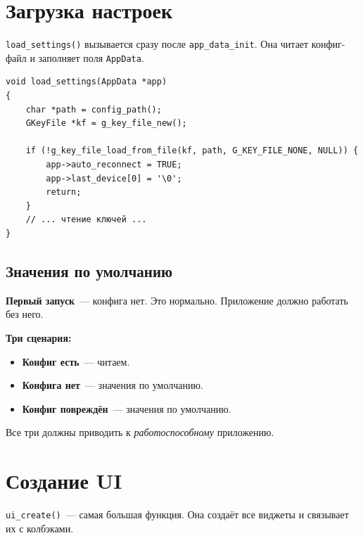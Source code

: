 \section{Загрузка настроек}
\label{sec:lifecycle-load}

\texttt{load\_settings()} вызывается сразу после
\texttt{app\_data\_init}. Она читает конфиг-файл
и заполняет поля \texttt{AppData}.

\begin{listing}[htbp]
\begin{verbatim}
void load_settings(AppData *app)
{
    char *path = config_path();
    GKeyFile *kf = g_key_file_new();

    if (!g_key_file_load_from_file(kf, path, G_KEY_FILE_NONE, NULL)) {
        app->auto_reconnect = TRUE;
        app->last_device[0] = '\0';
        return;
    }
    // ... чтение ключей ...
}
\end{verbatim}
\caption{\texttt{load\_settings()}~--- загрузка}
\label{lst:lifecycle-load}
\end{listing}

\subsection{Значения по умолчанию}

\textbf{Первый запуск}~--- конфига нет. Это нормально.
Приложение должно работать без него.

\begin{keybox}
\textbf{Три сценария:}
\begin{itemize}
    \item \textbf{Конфиг есть}~--- читаем.
    \item \textbf{Конфига нет}~--- значения по умолчанию.
    \item \textbf{Конфиг повреждён}~--- значения по умолчанию.
\end{itemize}
Все три должны приводить к \emph{работоспособному} приложению.
\end{keybox}

\section{Создание UI}
\label{sec:lifecycle-ui}

\texttt{ui\_create()}~--- самая большая функция.
Она создаёт все виджеты и связывает их
с колбэками.

